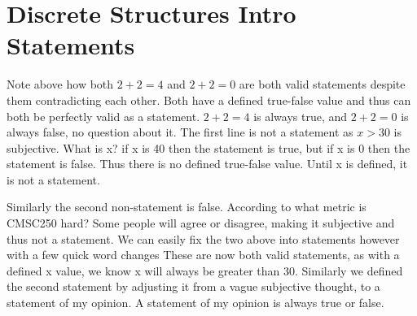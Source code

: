 \chapter{Discrete Structures Intro Statements}
Note above how both $2+2=4$ and $2+2=0$ are both valid statements despite them contradicting each other. Both have a defined true-false value and thus can both be perfectly valid as a statement. $2+2=4$ is always true, and $2+2=0$ is always false, no question about it.
The first line is not a statement as $x>30$ is subjective. What is x? if x is 40 then the statement is true, but if x is 0 then the statement is false. Thus there is no defined true-false value. Until x is defined, it is not a statement.

Similarly the second non-statement is false. According to what metric is CMSC250 hard? Some people will agree or disagree, making it subjective and thus not a statement. We can easily fix the two above into statements however with a few quick word changes
These are now both valid statements, as with a defined x value, we know x will always be greater than 30.
Similarly we defined the second statement by adjusting it from a vague subjective thought, to a statement of my opinion. A statement of my opinion is always true or false.
